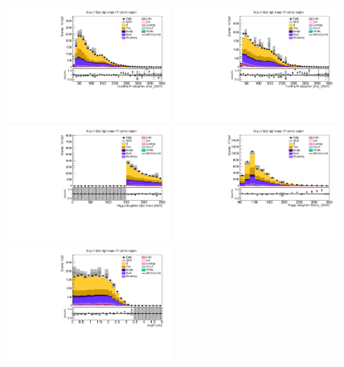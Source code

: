 \begin{figure}[tbp]
  \begin{center}
    \includegraphics[width=0.48\textwidth]{figures/wlnhbb2016/resolved/WmnWHHeavyFlavorCRHighMass_Hbjet1Pt.pdf}
    \includegraphics[width=0.48\textwidth]{figures/wlnhbb2016/resolved/WmnWHHeavyFlavorCRHighMass_Hbjet2Pt.pdf}
    \includegraphics[width=0.48\textwidth]{figures/wlnhbb2016/resolved/WmnWHHeavyFlavorCRHighMass_mH.pdf}
    \includegraphics[width=0.48\textwidth]{figures/wlnhbb2016/resolved/WmnWHHeavyFlavorCRHighMass_pTH.pdf}
    \includegraphics[width=0.48\textwidth]{figures/wlnhbb2016/resolved/WmnWHHeavyFlavorCRHighMass_dEtab1b2.pdf}

\end{center}
\end{figure}
